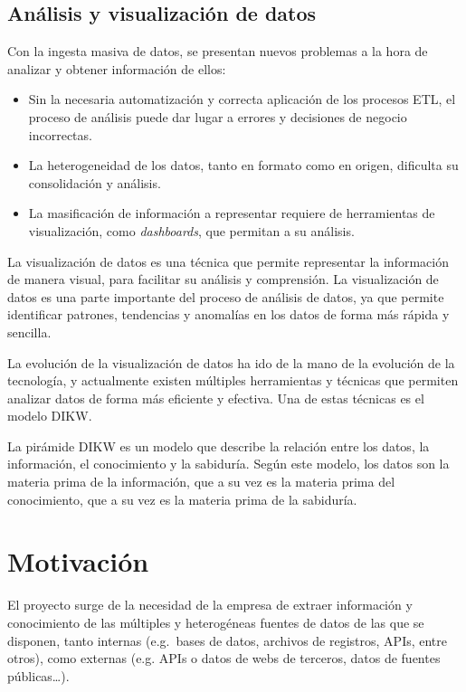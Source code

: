 \newpage{}
\subsection{Análisis y visualización de datos}\label{subsec:datos}
Con la ingesta masiva de datos, se presentan nuevos problemas a la hora de analizar y obtener
información de ellos:

\begin{itemize}
	\item Sin la necesaria automatización y correcta aplicación de los procesos ETL,
		el proceso de análisis puede dar lugar a errores y decisiones de negocio incorrectas.
	\item La heterogeneidad de los datos, tanto en formato como en origen, dificulta su
		consolidación y análisis.
	\item La masificación de información a representar requiere de herramientas de visualización,
		como \textit{dashboards}, que permitan a su análisis.
\end{itemize}

La visualización de datos es una técnica que permite representar la información de manera visual,
para facilitar su análisis y comprensión. La visualización de datos es una parte importante del
proceso de análisis de datos, ya que permite identificar patrones, tendencias y anomalías en los
datos de forma más rápida y sencilla.

La evolución de la visualización de datos ha ido de la mano de la evolución de la tecnología, y
actualmente existen múltiples herramientas y técnicas que permiten analizar datos de forma
más eficiente y efectiva. Una de estas técnicas es el modelo DIKW.

La pirámide DIKW\cite{enwiki:1211227190} es un modelo que describe la relación entre los datos,
la información, el conocimiento y la sabiduría. Según este modelo, los datos son la materia prima
de la información, que a su vez es la materia prima del conocimiento, que a su vez es la materia
prima de la sabiduría.

\newpage{}
\section{Motivación}\label{sec:motivacion}
El proyecto surge de la necesidad de la empresa de extraer información y conocimiento de las
múltiples y heterogéneas fuentes de datos de las que se disponen, tanto internas (e.g.~bases de
datos, archivos de registros, APIs, entre otros), como externas (e.g. APIs o datos de webs de
terceros, datos de fuentes públicas\ldots).

